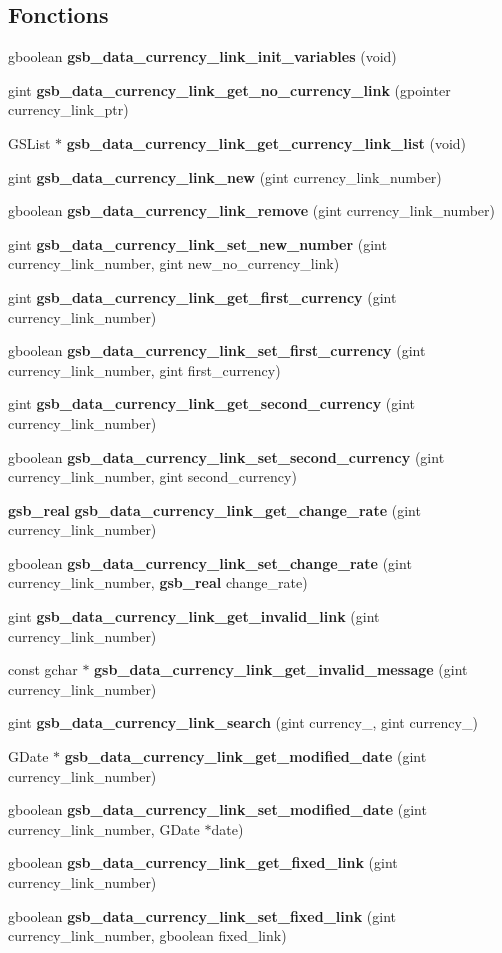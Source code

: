 \subsection*{Fonctions}
\begin{DoxyCompactItemize}
\item 
gboolean {\bf gsb\_\-data\_\-currency\_\-link\_\-init\_\-variables} (void)
\item 
gint {\bf gsb\_\-data\_\-currency\_\-link\_\-get\_\-no\_\-currency\_\-link} (gpointer currency\_\-link\_\-ptr)
\item 
GSList $\ast$ {\bf gsb\_\-data\_\-currency\_\-link\_\-get\_\-currency\_\-link\_\-list} (void)
\item 
gint {\bf gsb\_\-data\_\-currency\_\-link\_\-new} (gint currency\_\-link\_\-number)
\item 
gboolean {\bf gsb\_\-data\_\-currency\_\-link\_\-remove} (gint currency\_\-link\_\-number)
\item 
gint {\bf gsb\_\-data\_\-currency\_\-link\_\-set\_\-new\_\-number} (gint currency\_\-link\_\-number, gint new\_\-no\_\-currency\_\-link)
\item 
gint {\bf gsb\_\-data\_\-currency\_\-link\_\-get\_\-first\_\-currency} (gint currency\_\-link\_\-number)
\item 
gboolean {\bf gsb\_\-data\_\-currency\_\-link\_\-set\_\-first\_\-currency} (gint currency\_\-link\_\-number, gint first\_\-currency)
\item 
gint {\bf gsb\_\-data\_\-currency\_\-link\_\-get\_\-second\_\-currency} (gint currency\_\-link\_\-number)
\item 
gboolean {\bf gsb\_\-data\_\-currency\_\-link\_\-set\_\-second\_\-currency} (gint currency\_\-link\_\-number, gint second\_\-currency)
\item 
{\bf gsb\_\-real} {\bf gsb\_\-data\_\-currency\_\-link\_\-get\_\-change\_\-rate} (gint currency\_\-link\_\-number)
\item 
gboolean {\bf gsb\_\-data\_\-currency\_\-link\_\-set\_\-change\_\-rate} (gint currency\_\-link\_\-number, {\bf gsb\_\-real} change\_\-rate)
\item 
gint {\bf gsb\_\-data\_\-currency\_\-link\_\-get\_\-invalid\_\-link} (gint currency\_\-link\_\-number)
\item 
const gchar $\ast$ {\bf gsb\_\-data\_\-currency\_\-link\_\-get\_\-invalid\_\-message} (gint currency\_\-link\_\-number)
\item 
gint {\bf gsb\_\-data\_\-currency\_\-link\_\-search} (gint currency\_, gint currency\_)
\item 
GDate $\ast$ {\bf gsb\_\-data\_\-currency\_\-link\_\-get\_\-modified\_\-date} (gint currency\_\-link\_\-number)
\item 
gboolean {\bf gsb\_\-data\_\-currency\_\-link\_\-set\_\-modified\_\-date} (gint currency\_\-link\_\-number, GDate $\ast$date)
\item 
gboolean {\bf gsb\_\-data\_\-currency\_\-link\_\-get\_\-fixed\_\-link} (gint currency\_\-link\_\-number)
\item 
gboolean {\bf gsb\_\-data\_\-currency\_\-link\_\-set\_\-fixed\_\-link} (gint currency\_\-link\_\-number, gboolean fixed\_\-link)
\end{DoxyCompactItemize}
